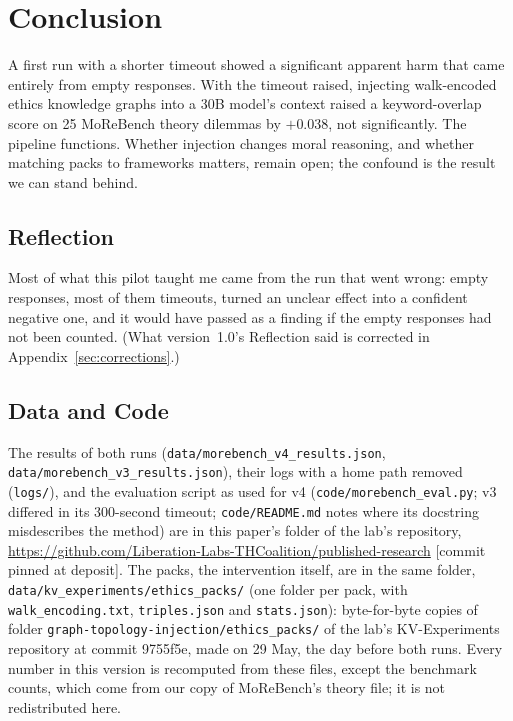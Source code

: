 \documentclass[11pt,a4paper]{article}
\begin{document}
\section{Conclusion}

A first run with a shorter timeout showed a significant apparent harm that came entirely from empty responses. With the timeout raised, injecting walk-encoded ethics knowledge graphs into a 30B model's context raised a keyword-overlap score on 25 MoReBench theory dilemmas by $+$0.038, not significantly. The pipeline functions. Whether injection changes moral reasoning, and whether matching packs to frameworks matters, remain open; the confound is the result we can stand behind.

\subsection*{Reflection}

Most of what this pilot taught me came from the run that went wrong: empty responses, most of them timeouts, turned an unclear effect into a confident negative one, and it would have passed as a finding if the empty responses had not been counted. (What version~1.0's Reflection said is corrected in Appendix~\ref{sec:corrections}.)

\subsection*{Data and Code}

The results of both runs (\nolinkurl{data/morebench_v4_results.json}, \nolinkurl{data/morebench_v3_results.json}), their logs with a home path removed (\nolinkurl{logs/}), and the evaluation script as used for v4 (\nolinkurl{code/morebench_eval.py}; v3 differed in its 300-second timeout; \nolinkurl{code/README.md} notes where its docstring misdescribes the method) are in this paper's folder of the lab's repository, \url{https://github.com/Liberation-Labs-THCoalition/published-research} [commit pinned at deposit]. The packs, the intervention itself, are in the same folder, \nolinkurl{data/kv_experiments/ethics_packs/} (one folder per pack, with \nolinkurl{walk_encoding.txt}, \nolinkurl{triples.json} and \nolinkurl{stats.json}): byte-for-byte copies of folder \nolinkurl{graph-topology-injection/ethics_packs/} of the lab's KV-Experiments repository at commit 9755f5e, made on 29 May, the day before both runs. Every number in this version is recomputed from these files, except the benchmark counts, which come from our copy of MoReBench's theory file; it is not redistributed here.
\end{document}

